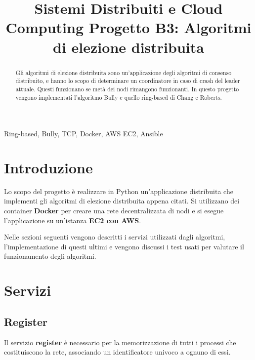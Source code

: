 \documentclass[conference]{IEEEtran}
\begin{document}
\title{Sistemi Distribuiti e Cloud Computing
Progetto B3: Algoritmi di elezione distribuita}

\author{
}

\maketitle

\begin{abstract}
Gli algoritmi di elezione distribuita sono un'applicazione degli algoritmi di consenso distribuito, e hanno lo scopo di determinare un coordinatore in caso di crash del leader attuale.
Questi funzionano se metà dei nodi rimangono funzionanti.
In questo progetto vengono implementati l'algoritmo Bully e quello ring-based di Chang e Roberts.
\end{abstract}

\begin{IEEEkeywords}
Ring-based, Bully, TCP, Docker, AWS EC2, Ansible
\end{IEEEkeywords}


\section{Introduzione}\label{sec:intro}
Lo scopo del progetto è realizzare in Python un'applicazione distribuita che implementi gli algoritmi di elezione distribuita appena citati.
Si utilizzano dei container \textbf{Docker} per creare una rete decentralizzata di nodi e si esegue l'applicazione su un'istanza \textbf{EC2 con AWS}.

Nelle sezioni seguenti vengono descritti i servizi utilizzati dagli algoritmi, l'implementazione di questi ultimi e vengono discussi i test usati per valutare il funzionamento degli algoritmi.


\section{Servizi}\label{sec:services}


\subsection{Register}\label{register}

Il servizio \textbf{register} è necessario per la memorizzazione di tutti i processi che costituiscono la rete, associando un identificatore univoco a ognuno di essi.
\end{document}
